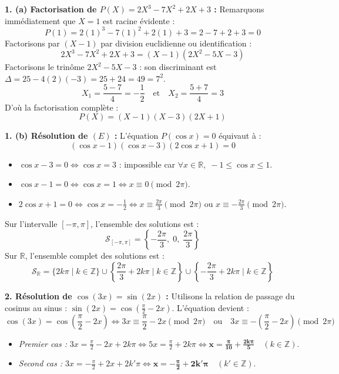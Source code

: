 \documentclass[11pt,a4paper]{article}
\newcommand{\Z}{\mathbb{Z}}
\newcommand{\R}{\mathbb{R}}
\begin{document}
\begin{correctionbox}
\textbf{1. (a) Factorisation de $P(X) = 2X^3 - 7X^2 + 2X + 3$ :}
Remarquons immédiatement que $X = 1$ est racine évidente :
\[
P(1) = 2(1)^3 - 7(1)^2 + 2(1) + 3 = 2 - 7 + 2 + 3 = 0
\]
Factorisons par $(X - 1)$ par division euclidienne ou identification :
\[
2X^3 - 7X^2 + 2X + 3 = (X - 1)(2X^2 - 5X - 3)
\]
Factorisons le trinôme $2X^2 - 5X - 3$ : son discriminant est $\Delta = 25 - 4(2)(-3) = 25 + 24 = 49 = 7^2$.
\[
X_1 = \frac{5 - 7}{4} = -\frac{1}{2} \quad \text{et} \quad X_2 = \frac{5 + 7}{4} = 3
\]
D'où la factorisation complète :
\[
P(X) = (X - 1)(X - 3)(2X + 1)
\]

\textbf{1. (b) Résolution de $(E)$ :}
L'équation $P(\cos x) = 0$ équivaut à :
\[
(\cos x - 1)(\cos x - 3)(2\cos x + 1) = 0
\]
\begin{itemize}[label=$\bullet$]
    \item $\cos x - 3 = 0 \iff \cos x = 3$ : impossible car $\forall x \in \R, \; -1 \le \cos x \le 1$.
    \item $\cos x - 1 = 0 \iff \cos x = 1 \iff x \equiv 0 \pmod{2\pi}$.
    \item $2\cos x + 1 = 0 \iff \cos x = -\frac{1}{2} \iff x \equiv \frac{2\pi}{3} \pmod{2\pi}$ ou $x \equiv -\frac{2\pi}{3} \pmod{2\pi}$.
\end{itemize}
Sur l'intervalle $[-\pi, \pi]$, l'ensemble des solutions est :
\[
\mathcal{S}_{[-\pi, \pi]} = \left\{ -\frac{2\pi}{3}, \; 0, \; \frac{2\pi}{3} \right\}
\]
Sur $\R$, l'ensemble complet des solutions est :
\[
\mathcal{S}_{\R} = \{ 2k\pi \mid k \in \Z \} \cup \left\{ \frac{2\pi}{3} + 2k\pi \mid k \in \Z \right\} \cup \left\{ -\frac{2\pi}{3} + 2k\pi \mid k \in \Z \right\}
\]

\textbf{2. Résolution de $\cos(3x) = \sin(2x)$ :}
Utilisons la relation de passage du cosinus au sinus : $\sin(2x) = \cos\left(\frac{\pi}{2} - 2x\right)$.
L'équation devient :
\[
\cos(3x) = \cos\left(\frac{\pi}{2} - 2x\right) \iff 3x \equiv \frac{\pi}{2} - 2x \pmod{2\pi} \quad \text{ou} \quad 3x \equiv -\left(\frac{\pi}{2} - 2x\right) \pmod{2\pi}
\]
\begin{itemize}[label=$\bullet$]
    \item \emph{Premier cas :} $3x = \frac{\pi}{2} - 2x + 2k\pi \iff 5x = \frac{\pi}{2} + 2k\pi \iff \mathbf{x = \frac{\pi}{10} + \frac{2k\pi}{5}} \quad (k \in \Z)$.
    \item \emph{Second cas :} $3x = -\frac{\pi}{2} + 2x + 2k'\pi \iff \mathbf{x = -\frac{\pi}{2} + 2k'\pi} \quad (k' \in \Z)$.
\end{itemize}
\end{correctionbox}
\end{document}
